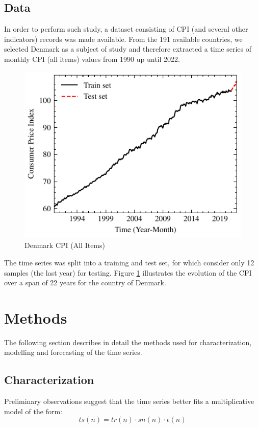 \documentclass[conference]{IEEEtran}
\begin{document}
\subsection{Data}
In order to perform such study, a dataset consisting of CPI (and several other indicators) records was made available. From the 191 available countries, we selected Denmark as a subject of study and therefore extracted a time series of monthly CPI (all items) values from 1990 up until 2022.

\begin{figure}[hbtp]
    \centering
    \includegraphics{../figs/cpi.pdf}
    \caption{Denmark CPI (All Items)}
    \label{fig:cpi}
\end{figure}

The time series was split into a training and test set, for which consider only 12 samples (the last year) for testing. Figure \ref{fig:cpi} illustrates the evolution of the CPI over a span of 22 years for the country of Denmark.

\section{Methods}
The following section describes in detail the methods used for characterization, modelling and forecasting of the time series.
\subsection{Characterization}
Preliminary observations suggest that the time series better fits a multiplicative model of the form:
\[
ts(n)=tr(n)\cdot sn(n)\cdot \epsilon(n)
\]
\end{document}
